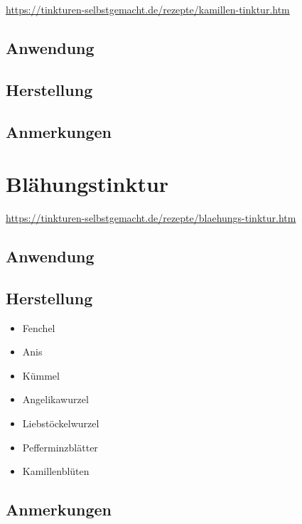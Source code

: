 \cite{tinkturen}

\url{https://tinkturen-selbstgemacht.de/rezepte/kamillen-tinktur.htm}

\subsection{Anwendung}

\subsection{Herstellung}

\subsection{Anmerkungen}







\section{Blähungstinktur}

\cite{tinkturen}  

\url{https://tinkturen-selbstgemacht.de/rezepte/blaehungs-tinktur.htm}

\subsection{Anwendung}


\subsection{Herstellung}


\begin{itemize}
	\item Fenchel
	\item Anis
	\item Kümmel
	\item Angelikawurzel
	\item Liebstöckelwurzel
	\item Pefferminzblätter
	\item Kamillenblüten
\end{itemize}

\subsection{Anmerkungen}




